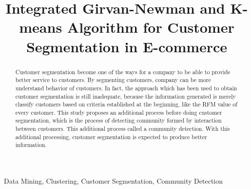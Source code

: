 \documentclass[conference]{IEEEtran}
\begin{document}
%
\title{Integrated Girvan-Newman and K-means Algorithm for Customer Segmentation in E-commerce}


\author{
\and
{}
}

\maketitle


\begin{abstract}
Customer segmentation become one of  the ways for a company to be able to provide better service to customers. By segmenting customers, company can be more understand behavior of customers. In fact, the approach which has been used to obtain customer segmentation is still inadequate, because the information generated is merely classify customers based on criteria established at the beginning, like the RFM value of every customer. This study proposes an additional process before doing customer segmentation, which is the process of detecting  community formed by interaction between customers. This additional process called a community detection. With this additional processing, customer segmentation is expected to produce better information.
\end{abstract}

\begin{IEEEkeywords}
Data Mining, Clustering, Customer Segmentation, Community Detection
\end{IEEEkeywords}
\end{document}
